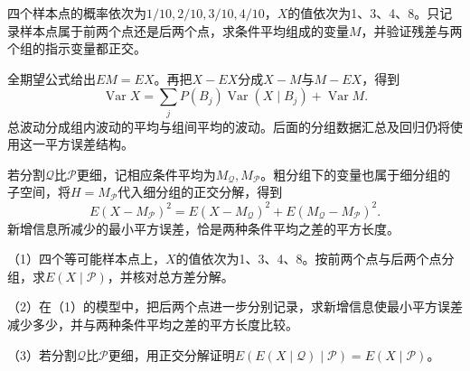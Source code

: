 \begin{example}
四个样本点的概率依次为\(1/10,2/10,3/10,4/10\)，\(X\)的值依次为1、3、4、8。只记录样本点属于前两个点还是后两个点，求条件平均组成的变量\(M\)，并验证残差与两个组的指示变量都正交。
\end{example}

全期望公式给出\(EM=EX\)。再把\(X-EX\)分成\(X-M\)与\(M-EX\)，得到
\begin{equation}\label{eq:prob-total-variance}
 \operatorname{Var}X=\sum_jP(B_j)\operatorname{Var}(X\mid B_j)
 +\operatorname{Var}M.
\end{equation}
总波动分成组内波动的平均与组间平均的波动。后面的分组数据汇总及回归仍将使用这一平方误差结构。

若分割\(\mathcal Q\)比\(\mathcal P\)更细，记相应条件平均为\(M_{\mathcal Q},M_{\mathcal P}\)。粗分组下的变量也属于细分组的子空间，将\(H=M_{\mathcal P}\)代入细分组的正交分解，得到
\[
 E(X-M_{\mathcal P})^2
 =E(X-M_{\mathcal Q})^2+E(M_{\mathcal Q}-M_{\mathcal P})^2.
\]
新增信息所减少的最小平方误差，恰是两种条件平均之差的平方长度。

\begin{exercise}
\mbox{}\par\nobreak

（1）四个等可能样本点上，\(X\)的值依次为1、3、4、8。按前两个点与后两个点分组，求\(E(X\mid\mathcal P)\)，并核对总方差分解。

（2）在（1）的模型中，把后两个点进一步分别记录，求新增信息使最小平方误差减少多少，并与两种条件平均之差的平方长度比较。

（3）若分割\(\mathcal Q\)比\(\mathcal P\)更细，用正交分解证明\(E(E(X\mid\mathcal Q)\mid\mathcal P)=E(X\mid\mathcal P)\)。
\end{exercise}
